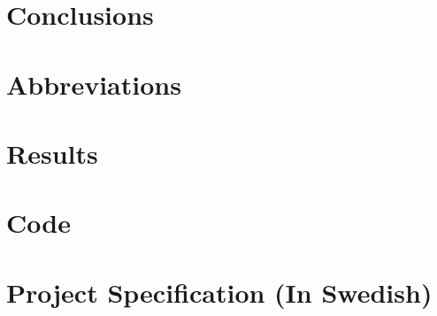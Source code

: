 \documentclass[12pt,twoside]{kau_report}
\begin{document}
\section{Conclusions}
\label{sec:conclusion}

\cleardoublepage


\begin{singlespace}


\end{singlespace}
\cleardoublepage

\appendix
\section{Abbreviations}
\label{sec:abbreviations}

\cleardoublepage

\section{Results}
\label{app:results}



\cleardoublepage

%


\section{Code}
\label{app:code}

\cleardoublepage

\section{Project Specification (In Swedish)}
\label{app:projectspec}
%
%
\end{document}
